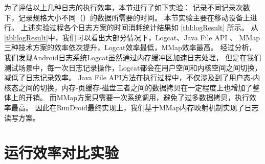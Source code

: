 为了评估以上几种日志的执行效率，本节进行了如下实验：
记录不同记录次数下，记录规格大小不同（）的数据所需要的时间。
本节实验主要在移动设备上进行。
上述实验过程各个日志方案的时间消耗统计结果如 \autoref{tbl:logResult} 所示。
从\autoref{tbl:logResult}中，我们可以看出大部分情况下，Logcat、Java File API 、 MMap三种技术方案的效率依次提升，Logcat效率最低，MMap效率最高。
经过分析，我们发现Android日志系统Logcat虽然通过内存缓冲区加速日志处理，
但是在我们测试场景中，每一次日志记录操作，Logcat都会在用户空间和内核空间之间切换，减低了日志记录效率。
Java File API方法在执行过程中，不仅涉及到了用户态-内核态之间的切换，内存-页缓存-磁盘三者之间的数据拷贝在一定程度上也增加了整体上的开销。
而MMap方案只需要一次系统调用，避免了过多数据拷贝，执行效率最高。
因此在RunDroid最终实现上，我们基于MMap内存映射机制实现了日志读写方案。


\section{运行效率对比实验}


